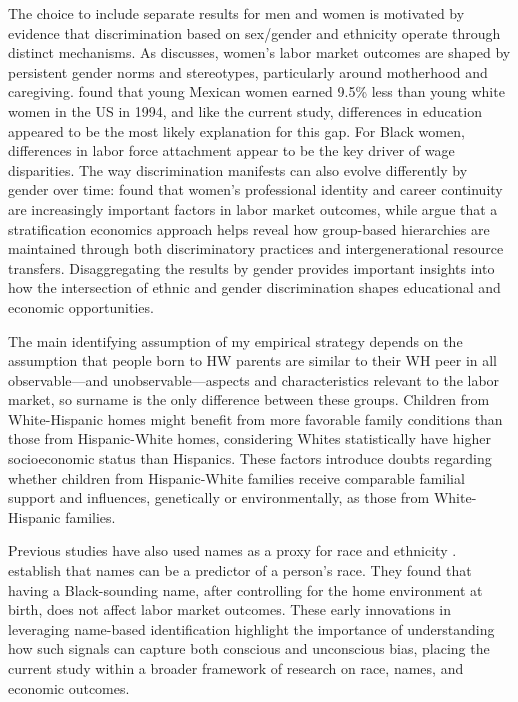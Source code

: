 The choice to include separate results for men and women is motivated by evidence that discrimination based on sex/gender and ethnicity operate through distinct mechanisms. As \textcite{bertrand2020gender} discusses, women's labor market outcomes are shaped by persistent gender norms and stereotypes, particularly around motherhood and caregiving. \textcite{antecol2002relative} found that young Mexican women earned 9.5\% less than young white women in the US in 1994, and like the current study, differences in education appeared to be the most likely explanation for this gap. For Black women, differences in labor force attachment appear to be the key driver of wage disparities. The way discrimination manifests can also evolve differently by gender over time: \textcite{goldin2004making} found that women's professional identity and career continuity are increasingly important factors in labor market outcomes, while \textcite{darity2015tour} argue that a stratification economics approach helps reveal how group-based hierarchies are maintained through both discriminatory practices and intergenerational resource transfers. Disaggregating the results by gender provides important insights into how the intersection of ethnic and gender discrimination shapes educational and economic opportunities.

The main identifying assumption of my empirical strategy depends on the assumption that people born to HW parents are similar to their WH peer in all observable---and unobservable---aspects and characteristics relevant to the labor market, so surname is the only difference between these groups. Children from White-Hispanic homes might benefit from more favorable family conditions than those from Hispanic-White homes, considering Whites statistically have higher socioeconomic status than Hispanics.  These factors introduce doubts regarding whether children from Hispanic-White families receive comparable familial support and influences, genetically or environmentally, as those from White-Hispanic families.

Previous studies have also used names as a proxy for race and ethnicity \autocite{fryer2004causes, bertrand2004emily}. \textcite{fryer2004causes} establish that names can be a predictor of a person's race. They found that having a Black-sounding name, after controlling for the home environment at birth, does not affect labor market outcomes. These early innovations in leveraging name-based identification highlight the importance of understanding how such signals can capture both conscious and unconscious bias, placing the current study within a broader framework of research on race, names, and economic outcomes. 

